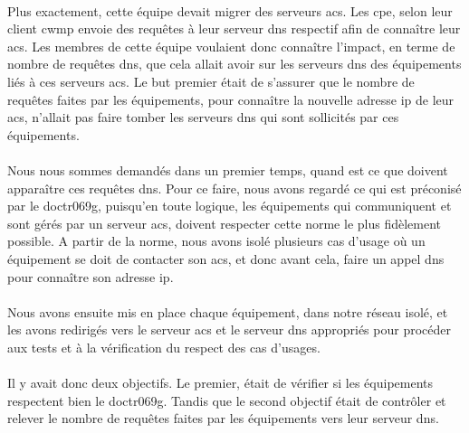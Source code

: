 \documentclass[12pt,a4paper]{report}
\begin{document}
\paragraph*{}Plus exactement, cette équipe devait migrer des serveurs \gls{acs}. Les \gls{cpe}, selon leur client \gls{cwmp} envoie des requêtes à leur serveur \gls{dns} respectif afin de connaître leur \gls{acs}. Les membres de cette équipe voulaient donc connaître l’impact, en terme de nombre de requêtes \gls{dns}, que cela allait avoir sur les serveurs \gls{dns} des équipements liés à ces serveurs \gls{acs}. Le but premier était de s’assurer que le nombre de requêtes faites par les équipements, pour connaître la nouvelle adresse \gls{ip} de leur \gls{acs}, n’allait pas faire tomber les serveurs \gls{dns} qui sont sollicités par ces équipements. 
\paragraph*{}Nous nous sommes demandés dans un premier temps, quand est ce que doivent apparaître ces requêtes \gls{dns}. Pour ce faire, nous avons regardé ce qui est préconisé par le \gls{doctr069g}, puisqu’en toute logique, les équipements qui communiquent et sont gérés par un serveur \gls{acs}, doivent respecter cette norme le plus fidèlement possible. A partir de la norme, nous avons isolé plusieurs cas d’usage où un équipement se doit de contacter son \gls{acs}, et donc avant cela, faire un appel \gls{dns} pour connaître son adresse \gls{ip}. 
\paragraph*{}Nous avons ensuite mis en place chaque équipement, dans notre réseau isolé, et les avons redirigés vers le serveur \gls{acs} et le serveur \gls{dns} appropriés pour procéder aux tests et à la vérification du respect des cas d’usages. 
\paragraph*{}Il y avait donc deux objectifs. Le premier, était de vérifier si les équipements respectent bien le \gls{doctr069g}. Tandis que le second objectif était de contrôler et relever le nombre de requêtes faites par les équipements vers leur serveur \gls{dns}. 
\end{document}
